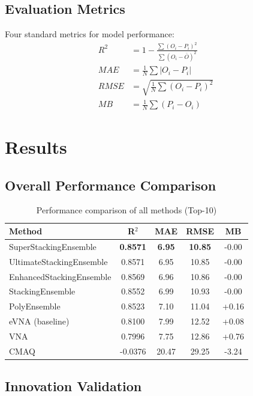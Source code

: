 \subsection{Evaluation Metrics}

Four standard metrics for model performance:
\begin{align}
    R^2 &= 1 - \frac{\sum(O_i - P_i)^2}{\sum(O_i - \bar{O})^2} \\
    MAE &= \frac{1}{N}\sum|O_i - P_i| \\
    RMSE &= \sqrt{\frac{1}{N}\sum(O_i - P_i)^2} \\
    MB &= \frac{1}{N}\sum(P_i - O_i)
\end{align}

\section{Results}
\label{sec:results}

\subsection{Overall Performance Comparison}

\begin{table}[h]
\centering
\caption{Performance comparison of all methods (Top-10)}
\label{tab:results}
\begin{tabular}{lcccc}
\toprule
\textbf{Method} & \textbf{R$^2$} & \textbf{MAE} & \textbf{RMSE} & \textbf{MB} \\
\midrule
SuperStackingEnsemble & \textbf{0.8571} & \textbf{6.95} & \textbf{10.85} & -0.00 \\
UltimateStackingEnsemble & 0.8571 & 6.95 & 10.85 & -0.00 \\
EnhancedStackingEnsemble & 0.8569 & 6.96 & 10.86 & -0.00 \\
StackingEnsemble & 0.8552 & 6.99 & 10.93 & -0.00 \\
PolyEnsemble & 0.8523 & 7.10 & 11.04 & +0.16 \\
eVNA (baseline) & 0.8100 & 7.99 & 12.52 & +0.08 \\
VNA & 0.7996 & 7.75 & 12.86 & +0.76 \\
CMAQ & -0.0376 & 20.47 & 29.25 & -3.24 \\
\bottomrule
\end{tabular}
\end{table}

\subsection{Innovation Validation}

